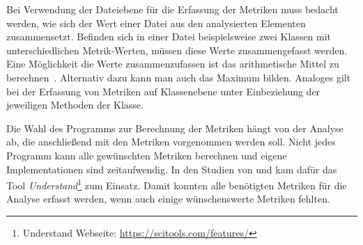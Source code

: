 Bei Verwendung der Dateiebene für die Erfassung der Metriken muss bedacht werden, wie sich der Wert einer Datei aus den analysierten Elementen zusammensetzt.
Befinden sich in einer Datei beispielsweise zwei Klassen mit unterschiedlichen Metrik-Werten, müssen diese Werte zusammengefasst werden.
Eine Möglichkeit die Werte zusammenzufassen ist das arithmetische Mittel zu berechnen~\cite{chowdhury_zulkernine_2009}.
Alternativ dazu kann man auch das Maximum bilden.
Analoges gilt bei der Erfassung von Metriken auf Klassenebene unter Einbeziehung der jeweiligen Methoden der Klasse.

Die Wahl des Programms zur Berechnung der Metriken hängt von der Analyse ab, die anschließend mit den Metriken vorgenommen werden soll.
Nicht jedes Programm kann alle gewünschten Metriken berechnen und eigene Implementationen sind zeitaufwendig.
In den Studien von \cite{alves_et_al} und \cite{chowdhury_zulkernine_2009} kam dafür das Tool \emph{Understand}\footnote{Understand Webseite: \url{https://scitools.com/features/}} zum Einsatz.
Damit konnten alle benötigten Metriken für die Analyse erfasst werden, wenn auch einige wünschenswerte Metriken fehlten.
